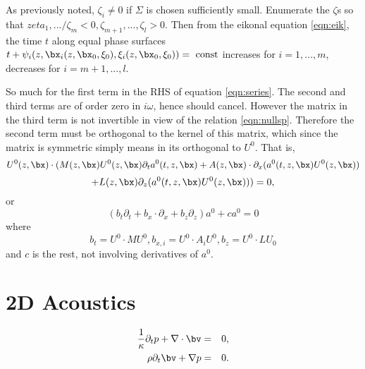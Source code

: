 As previously noted, $\zeta_i \ne 0$ if $\Sigma$ is chosen
sufficiently small. Enumerate the $\zeta$s so that $zeta_1,.../\zeta_m
< 0, \zeta_{m+1},...,\zeta_l > 0$. Then from the eikonal equation
\ref{eqn:eik}, the time $t$ along equal phase surfaces $t +
\psi_i(z,\bx_i(z,\bx_0,\xi_0),\xi_i(z,\bx_0,\xi_0)) = \mbox{ const}$
increases for $i=1,...,m$, decreases for $i=m+1,...,l$.

So much for the first term in the RHS of equation
\ref{eqn:series}. The second and third terms are of order zero in
$i\omega$, hence should cancel. However the matrix in the third term
is not invertible in view of the relation \ref{eqn:nullsp}. Therefore
the second term must be orthogonal to the kernel of this matrix, which
since the matrix is symmetric simply means in its orthogonal to $U^0$.
That is,
\[
U^0(z,\bx) \cdot (M(z,\bx) U^0(z,\bx) \partial_t a^0(t,z,\bx) + A(z,\bx)\cdot \partial_x
(a^0(t,z,\bx) U^0(z,\bx))
\]
\[+ L(z,\bx)\partial_z
  (a^0(t,z,\bx)U^0(z,\bx))) = 0,
\]
or
\[
 (b_t \partial_t + b_x \cdot \partial_x + b_z \partial_z)
 a^0 + c a^0 = 0
\]
where
\[
  b_t = U^0 \cdot M U^0, b_{x,i} = U^0 \cdot A_i U^0, b_z = U^0 \cdot
  L U_0
\]
and $c$ is the rest, not involving derivatives of $a^0$.



\section{2D Acoustics}

\begin{eqnarray}
  \frac{1}{\kappa}\partial_t p + \nabla \cdot \bv & = & 0, \nonumber \\
  \rho \partial_t \bv + \nabla p & = & 0.
  \label{eqn:awe}                                     
\end{eqnarray}

